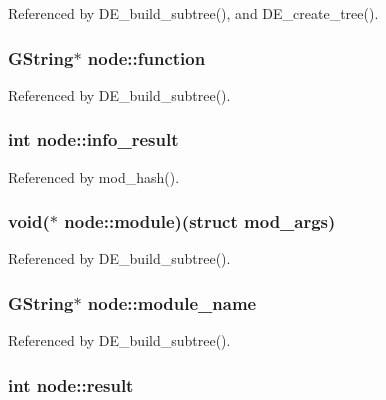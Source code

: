 Referenced by DE\_\-build\_\-subtree(), and DE\_\-create\_\-tree().
\subsubsection[{function}]{\setlength{\rightskip}{0pt plus 5cm}GString$\ast$ {\bf node::function}}\label{structnode_c6c04c8723c0f2c1177c749dd04cea2a}




Referenced by DE\_\-build\_\-subtree().
\subsubsection[{info\_\-result}]{\setlength{\rightskip}{0pt plus 5cm}int {\bf node::info\_\-result}}\label{structnode_665cc15454c96e047276a7586e7bbd1f}




Referenced by mod\_\-hash().
\subsubsection[{module}]{\setlength{\rightskip}{0pt plus 5cm}void($\ast$ {\bf node::module})(struct {\bf mod\_\-args})}\label{structnode_fdccefeda4700574838354548b2c0e96}




Referenced by DE\_\-build\_\-subtree().
\subsubsection[{module\_\-name}]{\setlength{\rightskip}{0pt plus 5cm}GString$\ast$ {\bf node::module\_\-name}}\label{structnode_f8c77a11e8cec4db238f7142008b0b26}




Referenced by DE\_\-build\_\-subtree().
\subsubsection[{result}]{\setlength{\rightskip}{0pt plus 5cm}int {\bf node::result}}\label{structnode_2c704f701a1f9d7c7a4fa1b4546bd67b}




